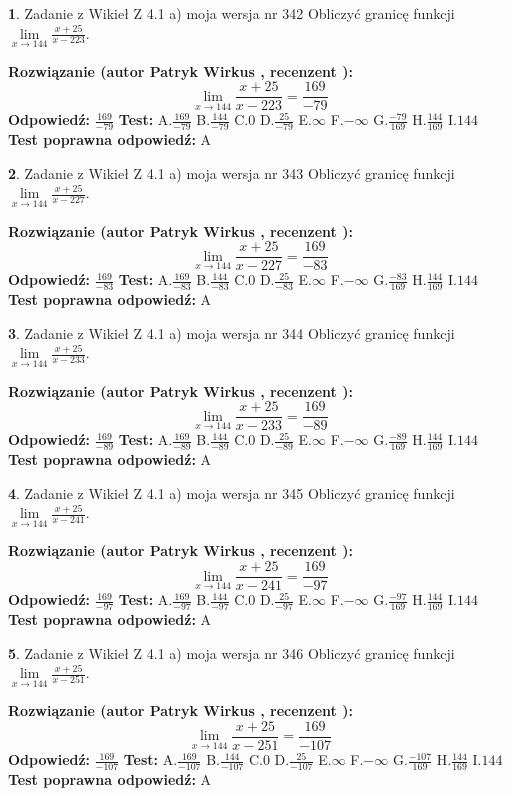 \documentclass[12pt, a4paper]{article}
\theoremstyle{definition} %
\newtheorem{zad}{}
\newcommand{\zadStart}[1]{\begin{zad}#1\newline}
\newcommand{\zadStop}{\end{zad}}
\newcommand{\rozwStart}[2]{\noindent \textbf{Rozwiązanie (autor #1 , recenzent #2): }\newline}
\newcommand{\rozwStop}{\newline}
\newcommand{\odpStart}{\noindent \textbf{Odpowiedź:}\newline}
\newcommand{\odpStop}{\newline}
\newcommand{\testStart}{\noindent \textbf{Test:}\newline}
\newcommand{\testStop}{\newline}
\newcommand{\kluczStart}{\noindent \textbf{Test poprawna odpowiedź:}\newline}
\newcommand{\kluczStop}{\newline}
\begin{document}
\zadStart{Zadanie z Wikieł Z 4.1 a) moja wersja nr 342}
Obliczyć granicę funkcji $\lim\limits_{x\to144}\frac{x+25}{x-223}$.
\zadStop
\rozwStart{Patryk Wirkus}{}
$$\lim\limits_{x\to144}\frac{x+25}{x-223} = \frac{169}{-79}$$
\rozwStop
\odpStart
$\frac{169}{-79}$
\odpStop
\testStart
A.$\frac{169}{-79}$
B.$\frac{144}{-79}$
C.$0$
D.$\frac{25}{-79}$
E.$\infty$
F.$-\infty$
G.$\frac{-79}{169}$
H.$\frac{144}{169}$
I.$144$
\testStop
\kluczStart
A
\kluczStop



\zadStart{Zadanie z Wikieł Z 4.1 a) moja wersja nr 343}
Obliczyć granicę funkcji $\lim\limits_{x\to144}\frac{x+25}{x-227}$.
\zadStop
\rozwStart{Patryk Wirkus}{}
$$\lim\limits_{x\to144}\frac{x+25}{x-227} = \frac{169}{-83}$$
\rozwStop
\odpStart
$\frac{169}{-83}$
\odpStop
\testStart
A.$\frac{169}{-83}$
B.$\frac{144}{-83}$
C.$0$
D.$\frac{25}{-83}$
E.$\infty$
F.$-\infty$
G.$\frac{-83}{169}$
H.$\frac{144}{169}$
I.$144$
\testStop
\kluczStart
A
\kluczStop



\zadStart{Zadanie z Wikieł Z 4.1 a) moja wersja nr 344}
Obliczyć granicę funkcji $\lim\limits_{x\to144}\frac{x+25}{x-233}$.
\zadStop
\rozwStart{Patryk Wirkus}{}
$$\lim\limits_{x\to144}\frac{x+25}{x-233} = \frac{169}{-89}$$
\rozwStop
\odpStart
$\frac{169}{-89}$
\odpStop
\testStart
A.$\frac{169}{-89}$
B.$\frac{144}{-89}$
C.$0$
D.$\frac{25}{-89}$
E.$\infty$
F.$-\infty$
G.$\frac{-89}{169}$
H.$\frac{144}{169}$
I.$144$
\testStop
\kluczStart
A
\kluczStop



\zadStart{Zadanie z Wikieł Z 4.1 a) moja wersja nr 345}
Obliczyć granicę funkcji $\lim\limits_{x\to144}\frac{x+25}{x-241}$.
\zadStop
\rozwStart{Patryk Wirkus}{}
$$\lim\limits_{x\to144}\frac{x+25}{x-241} = \frac{169}{-97}$$
\rozwStop
\odpStart
$\frac{169}{-97}$
\odpStop
\testStart
A.$\frac{169}{-97}$
B.$\frac{144}{-97}$
C.$0$
D.$\frac{25}{-97}$
E.$\infty$
F.$-\infty$
G.$\frac{-97}{169}$
H.$\frac{144}{169}$
I.$144$
\testStop
\kluczStart
A
\kluczStop



\zadStart{Zadanie z Wikieł Z 4.1 a) moja wersja nr 346}
Obliczyć granicę funkcji $\lim\limits_{x\to144}\frac{x+25}{x-251}$.
\zadStop
\rozwStart{Patryk Wirkus}{}
$$\lim\limits_{x\to144}\frac{x+25}{x-251} = \frac{169}{-107}$$
\rozwStop
\odpStart
$\frac{169}{-107}$
\odpStop
\testStart
A.$\frac{169}{-107}$
B.$\frac{144}{-107}$
C.$0$
D.$\frac{25}{-107}$
E.$\infty$
F.$-\infty$
G.$\frac{-107}{169}$
H.$\frac{144}{169}$
I.$144$
\testStop
\kluczStart
A
\kluczStop
\end{document}

